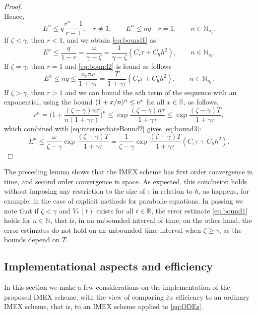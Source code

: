 \documentclass[a4paper,final]{siamart190516}
\newcommand{\Rb}{\mathbb{R}}
\newcommand{\Nb}{\mathbb{N}}
\begin{document}
\begin{proof}
\[  \]
  Hence,
  \begin{equation}\label{eq:intermediateBound2}
    E^n \leq q \frac{r^n - 1}{r-1}, \quad r \neq 1,
    \qquad E^n \leq n q \quad r = 1,
    \qquad
    n \in \Nb_{n_t}.
  \end{equation}
  If $ \zeta < \gamma$, then $r < 1$, and we obtain \eqref{eq:bound1} as
  \[
    E^n \leq 
   \frac{q}{1-r} = \frac{\omega}{\gamma - \zeta} = \frac{1}{\gamma -\zeta}(C_\tau
    \tau + C_h h^2),
    \qquad n \in \Nb_{n_t}.
  \]
%
  If $\zeta = \gamma$, then $r = 1$ and \eqref{eq:bound2} is found as follows
  \[
    E^n \leq n q 
    \leq \frac{n_t\tau \omega}{1 + \gamma\tau}%
    = \frac{T}{1 + \gamma\tau}(C_\tau \tau + C_h h^2),
    \qquad n \in \Nb_{n_t}.
  \]
%
  If $\zeta > \gamma$, then $r > 1$ and we can bound the $n$th term of the sequence
  with an exponential, using the bound $(1+x/n)^n \leq \operatorname{e}^x$ for all $x \in \Rb$, as
  follows,
  \[
    r^n = 
    \bigg(
      1 + \frac{(\zeta - \gamma) n \tau}{n(1+\gamma \tau)}
    \bigg)^n
    \leq
    \exp \frac{(\zeta - \gamma) n \tau}{1+\gamma \tau}
    \leq
    \exp \frac{(\zeta - \gamma) T}{1+\gamma \tau},
  \]
  which combined with \eqref{eq:intermediateBound2} gives \eqref{eq:bound3}:
  \[
    E^n \leq \frac{\omega}{\zeta - \gamma} \exp \frac{(\zeta - \gamma) T}{1+\gamma \tau}
     = \frac{1}{\zeta - \gamma} \exp \frac{(\zeta - \gamma) T}{1+\gamma \tau}
	   (C_\tau \tau + C_h h^2).
  \]
  
\end{proof}

The preceding lemma shows that the IMEX scheme has first order convergence in time,
and second order convergence in space. As expected, this conclusion holds without
imposing any restriction to the size of $\tau$ in relation to $h$, as happens, for
example, in the case of explicit methods for parabolic equations. In passing we note
that if $\zeta < \gamma$ and $V_*(t)$ exists for all $t \in \Rb$, the error estimate
\eqref{eq:bound1} holds for $n \in \Nb$, that is, in an unbounded interval of time;
on the other hand, the error estimates do not hold on an unbounded time interval when
$\zeta \geq \gamma$, as the bounds depend on $T$.

\subsection{Implementational aspects and efficiency}


In this section we make a few considerations on the implementation of the proposed
IMEX scheme, with the view of comparing its efficiency to an ordinary IMEX scheme,
that is, to an IMEX scheme applied to \eqref{eq:ODEs}.
\end{document}
